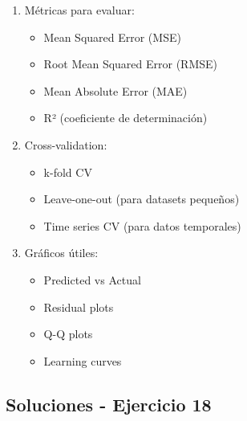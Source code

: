 \documentclass[12pt]{article}
\begin{document}
\begin{enumerate}
    \item Métricas para evaluar:
    \begin{itemize}
        \item Mean Squared Error (MSE)
        \item Root Mean Squared Error (RMSE)
        \item Mean Absolute Error (MAE)
        \item R² (coeficiente de determinación)
    \end{itemize}
    \item Cross-validation:
    \begin{itemize}
        \item k-fold CV
        \item Leave-one-out (para datasets pequeños)
        \item Time series CV (para datos temporales)
    \end{itemize}
    \item Gráficos útiles:
    \begin{itemize}
        \item Predicted vs Actual
        \item Residual plots
        \item Q-Q plots
        \item Learning curves
    \end{itemize}
\end{enumerate}

\subsection{Soluciones - Ejercicio 18}
\end{document}
